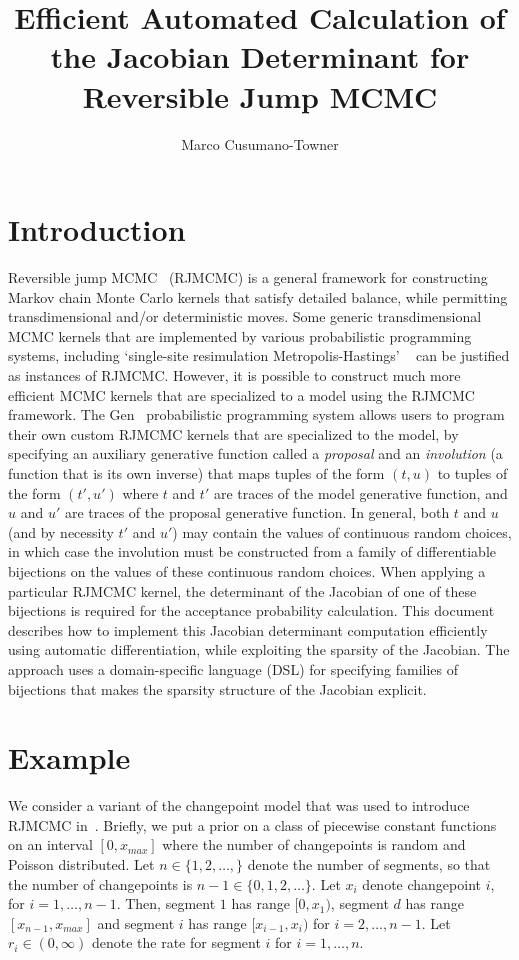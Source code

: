 \documentclass{article}
\title{Efficient Automated Calculation of the Jacobian Determinant for Reversible Jump MCMC}
\author{Marco Cusumano-Towner}
\date{}
\begin{document}
\maketitle

\section{Introduction}
Reversible jump MCMC~\citep{green1995reversible} (RJMCMC) is a general framework for constructing Markov chain Monte Carlo kernels that satisfy detailed balance, while permitting transdimensional and/or deterministic moves.
Some generic transdimensional MCMC kernels that are implemented by various probabilistic programming systems, including `single-site resimulation Metropolis-Hastings' ~\citep{goodman2008church,wingate2011lightweight} can be justified as instances of RJMCMC.
However, it is possible to construct much more efficient MCMC kernels that are specialized to a model using the RJMCMC framework.
The Gen~\citep{cusumano2019gen} probabilistic programming system allows users to program their own custom RJMCMC kernels that are specialized to the model, by specifying an auxiliary generative function called a \emph{proposal} and an \emph{involution} (a function that is its own inverse) that maps tuples of the form $(t, u)$ to tuples of the form $(t', u')$ where $t$ and $t'$ are traces of the model generative function, and $u$ and $u'$ are traces of the proposal generative function.
In general, both $t$ and $u$ (and by necessity $t'$ and $u'$) may contain the values of continuous random choices, in which case the involution must be constructed from a family of differentiable bijections on the values of these continuous random choices.
When applying a particular RJMCMC kernel, the determinant of the Jacobian of one of these bijections is required for the acceptance probability calculation.
This document describes how to implement this Jacobian determinant computation efficiently using automatic differentiation, while exploiting the sparsity of the Jacobian.
The approach uses a domain-specific language (DSL) for specifying families of bijections that makes the sparsity structure of the Jacobian explicit.

\section{Example}

We consider a variant of the changepoint model that was used to introduce RJMCMC in~\citep{green1995reversible}.
Briefly, we put a prior on a class of piecewise constant functions on an interval $[0, x_{max}]$ where the number of changepoints is random and Poisson distributed.
Let $n \in \{1, 2, \ldots, \}$ denote the number of segments, so that the number of changepoints is $n-1 \in \{0, 1, 2, \ldots\}$.
Let $x_i$ denote changepoint $i$, for $i=1,\ldots,n-1$.
Then, segment $1$ has range $[0, x_1)$, segment $d$ has range $[x_{n-1}, x_{max}]$ and segment $i$ has range $[x_{i-1}, x_i)$ for $i=2,\ldots,n-1$.
Let $r_i \in (0, \infty)$ denote the rate for segment $i$ for $i=1,\ldots,n$.
\end{document}
